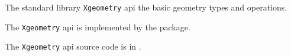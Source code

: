 
The standard library {\tt Xgeometry} api the basic geometry types and operations.

The {\tt Xgeometry} api is implemented by the  package.

The {\tt Xgeometry} api source code is in .

